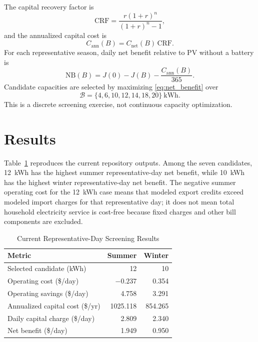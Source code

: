\documentclass[journal]{IEEEtran}
\begin{document}
The capital recovery factor is
\begin{equation}
\mathrm{CRF}=\frac{r(1+r)^n}{(1+r)^n-1},
\label{eq:crf}
\end{equation}
and the annualized capital cost is
\begin{equation}
C_{\mathrm{ann}}(B)=C_{\mathrm{net}}(B)\,\mathrm{CRF}.
\label{eq:annualized_cost}
\end{equation}
For each representative season, daily net benefit relative to PV without a battery is
\begin{equation}
\mathrm{NB}(B)=J(0)-J(B)-\frac{C_{\mathrm{ann}}(B)}{365}.
\label{eq:net_benefit}
\end{equation}
Candidate capacities are selected by maximizing \eqref{eq:net_benefit} over
\begin{equation}
\mathcal{B}=\{4,6,10,12,14,18,20\}\ \mathrm{kWh}.
\label{eq:candidates}
\end{equation}
This is a discrete screening exercise, not continuous capacity optimization.

\section{Results}
Table~\ref{tab:battery_results} reproduces the current repository outputs. Among the seven candidates, 12~kWh has the highest summer representative-day net benefit, while 10~kWh has the highest winter representative-day net benefit. The negative summer operating cost for the 12~kWh case means that modeled export credits exceed modeled import charges for that representative day; it does not mean total household electricity service is cost-free because fixed charges and other bill components are excluded.

\begin{table}[!t]
\centering
\caption{Current Representative-Day Screening Results}
\label{tab:battery_results}
\begin{tabular}{lrr}
\toprule
Metric & Summer & Winter \\
\midrule
Selected candidate (kWh) & 12 & 10 \\
Operating cost (\$/day) & $-0.237$ & 0.354 \\
Operating savings (\$/day) & 4.758 & 3.291 \\
Annualized capital cost (\$/yr) & 1025.118 & 854.265 \\
Daily capital charge (\$/day) & 2.809 & 2.340 \\
Net benefit (\$/day) & 1.949 & 0.950 \\
\bottomrule
\end{tabular}
\end{table}
\end{document}

